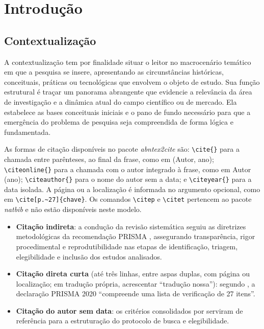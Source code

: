 \chapter{Introdução}
\label{ch:introducao}

\section{Contextualização}
\label{sec:contextualizacao}
A contextualização tem por finalidade situar o leitor no macrocenário temático em que a pesquisa se insere, apresentando as circunstâncias históricas, conceituais, práticas ou tecnológicas que envolvem o objeto de estudo. Sua função estrutural é traçar um panorama abrangente que evidencie a relevância da área de investigação e a dinâmica atual do campo científico ou de mercado. Ela estabelece as bases conceituais iniciais e o pano de fundo necessário para que a emergência do problema de pesquisa seja compreendida de forma lógica e fundamentada.


As formas de citação disponíveis no pacote \textit{abntex2cite} são: \verb|\cite{}| para a chamada entre parênteses, ao final da frase, como em (Autor, ano); \verb|\citeonline{}| para a chamada com o autor integrado à frase, como em Autor (ano); \verb|\citeauthor{}| para o nome do autor sem a data; e \verb|\citeyear{}| para a data isolada. A página ou a localização é informada no argumento opcional, como em \verb|\cite[p.~27]{chave}|. Os comandos \verb|\citep| e \verb|\citet| pertencem ao pacote \textit{natbib} e não estão disponíveis neste modelo.

\begin{itemize}
  \item \textbf{Citação indireta}: a condução da revisão sistemática seguiu as diretrizes metodológicas da recomendação PRISMA \cite{Page2021PRISMA}, assegurando transparência, rigor procedimental e reprodutibilidade nas etapas de identificação, triagem, elegibilidade e inclusão dos estudos analisados.
  \item \textbf{Citação direta curta} (até três linhas, entre aspas duplas, com página ou localização; em tradução própria, acrescentar ``tradução nossa''): segundo , a declaração PRISMA 2020 ``compreende uma lista de verificação de 27 itens''.
  \item \textbf{Citação do autor sem data}: os critérios consolidados por \citeauthor{Page2021PRISMA} serviram de referência para a estruturação do protocolo de busca e elegibilidade.
\end{itemize}

